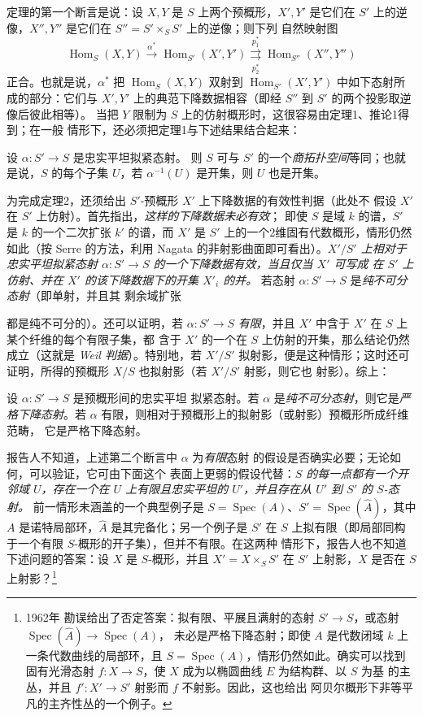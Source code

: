 定理的第一个断言是说：设 $X,Y$ 是 $S$ 上两个预概形，$X',Y'$ 是它们在
$S'$ 上的逆像，$X'',Y''$ 是它们在 $S''=S'\times_SS'$ 上的逆像；则下列
自然映射图
\[
  \operatorname{Hom}_S(X,Y)\xrightarrow{\alpha^*}
  \operatorname{Hom}_{S'}(X',Y')
  \underset{p_2^*}{\overset{p_1^*}{\rightrightarrows}}
  \operatorname{Hom}_{S''}(X'',Y'')
\]
正合。也就是说，$\alpha^*$ 把 $\operatorname{Hom}_S(X,Y)$ 双射到
$\operatorname{Hom}_{S'}(X',Y')$ 中如下态射所成的部分：它们与 $X',Y'$
上的典范下降数据相容（即经 $S''$ 到 $S'$ 的两个投影取逆像后彼此相等）。
当把 $Y$ 限制为 $S$ 上的仿射概形时，这很容易由定理1、推论1得到；在一般
情形下，还必须把定理1与下述结果结合起来：

 设 $\alpha:S'\longrightarrow S$ 是忠实平坦拟紧态射。
则 $S$ 可与 $S'$ 的一个\emph{商拓扑空间}等同；也就是说，$S$ 的每个子集
$U$，若 $\alpha^{-1}(U)$ 是开集，则 $U$ 也是开集。

为完成定理2，还须给出 $S'$-预概形 $X'$ 上下降数据的有效性判据（此处不
假设 $X'$ 在 $S'$ 上仿射）。首先指出，\emph{这样的下降数据未必有效}；
即使 $S$ 是域 $k$ 的谱，$S'$ 是 $k$ 的一个二次扩张 $k'$ 的谱，而 $X'$
是 $S'$ 上的一个2维固有代数概形，情形仍然如此（按 Serre 的方法，利用
Nagata 的非射影曲面即可看出）。\emph{$X'/S'$ 上相对于忠实平坦拟紧态射
$\alpha:S'\longrightarrow S$ 的一个下降数据有效，当且仅当 $X'$ 可写成
在 $S'$ 上仿射、并在 $X'$ 的该下降数据下的开集 $X'_i$ 的并。}
若态射 $\alpha:S'\longrightarrow S$ 是\emph{纯不可分态射}（即单射，并且其
剩余域扩张

都是纯不可分的）。还可以证明，若 $\alpha:S'\longrightarrow S$
\emph{有限}，并且 $X'$ 中含于 $X'$ 在 $S$ 上某个纤维的每个有限子集，都
含于 $X'$ 的一个在 $S$ 上仿射的开集，那么结论仍然成立（这就是
\emph{Weil 判据}）。特别地，若 $X'/S'$ 拟射影，便是这种情形；这时还可
证明，所得的预概形 $X/S$ 也拟射影（若 $X'/S'$ 射影，则它也
射影）。综上：

 设 $\alpha:S'\longrightarrow S$ 是预概形间的忠实平坦
拟紧态射。若 $\alpha$ 是\emph{纯不可分态射}，则它是\emph{严格下降态射}。若
$\alpha$ 有限，则相对于预概形上的拟射影（或射影）预概形所成纤维范畴，
它是严格下降态射。

 报告人不知道，上述第二个断言中 $\alpha$ 为\emph{有限}态射
的假设是否确实必要；无论如何，可以验证，它可由下面这个
表面上更弱的假设代替：\emph{$S$ 的每一点都有一个开邻域 $U$，存在一个在
$U$ 上有限且忠实平坦的 $U'$，并且存在从 $U'$ 到 $S'$ 的 $S$-态射。}
前一情形未涵盖的一个典型例子是
$S=\operatorname{Spec}(A)$、$S'=\operatorname{Spec}(\widehat A)$，其中
$A$ 是诺特局部环，$\widehat A$ 是其完备化；另一个例子是 $S'$ 在 $S$
上拟有限（即局部同构于一个有限 $S$-概形的开子集），但并不有限。在这两种
情形下，报告人也不知道下述问题的答案：设 $X$ 是 $S$-概形，并且
$X'=X\times_SS'$ 在 $S'$ 上射影，$X$ 是否在 $S$ 上射影？\footnote{1962年
勘误给出了否定答案：拟有限、平展且满射的态射
$S'\longrightarrow S$，或态射
$\operatorname{Spec}(\widehat A)\longrightarrow\operatorname{Spec}(A)$，
未必是严格下降态射；即使 $A$ 是代数闭域 $k$ 上一条代数曲线的局部环，且
$S=\operatorname{Spec}(A)$，情形仍然如此。确实可以找到固有光滑态射
$f:X\longrightarrow S$，使 $X$ 成为以椭圆曲线 $E$ 为结构群、以 $S$ 为基
的主丛，并且 $f':X'\longrightarrow S'$ 射影而 $f$ 不射影。因此，这也给出
阿贝尔概形下非等平凡的主齐性丛的一个例子。}

